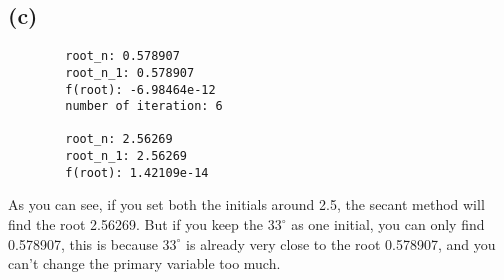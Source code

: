 \documentclass{article}
\begin{document}
\subsection{(c)}
    \begin{verbatim}
        root_n: 0.578907
        root_n_1: 0.578907
        f(root): -6.98464e-12
        number of iteration: 6

        root_n: 2.56269
        root_n_1: 2.56269
        f(root): 1.42109e-14
    \end{verbatim}

    As you can see, if you set both the initials around 2.5, the secant method will find the root 2.56269.
    But if you keep the $33^\circ$ as one initial, you can only find 0.578907, this is because $33^\circ$ is already very close to the root 0.578907,
    and you can't change the primary variable too much.
\end{document}
